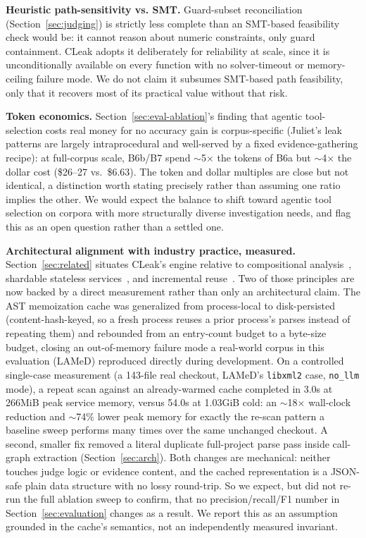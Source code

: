 \documentclass[11pt,a4paper]{article}
\begin{document}
\textbf{Heuristic path-sensitivity vs. SMT.} Guard-subset reconciliation
(Section~\ref{sec:judging}) is strictly less complete than an SMT-based
feasibility check would be: it cannot reason about numeric constraints,
only guard containment. CLeak adopts it deliberately for reliability at
scale, since it is unconditionally available on every function with no
solver-timeout or memory-ceiling failure mode. We do not claim it
subsumes SMT-based path feasibility, only that it recovers most of its
practical value without that risk.

\textbf{Token economics.} Section~\ref{sec:eval-ablation}'s finding that
agentic tool-selection costs real money for no accuracy gain is
corpus-specific (Juliet's leak patterns are largely intraprocedural and
well-served by a fixed evidence-gathering recipe): at full-corpus scale,
B6b/B7 spend $\sim$5$\times$ the tokens of B6a but $\sim$4$\times$ the
dollar cost (\$26--27 vs.\ \$6.63). The token and dollar multiples are
close but not identical, a distinction worth stating precisely rather than
assuming one ratio implies the other. We would expect the balance to
shift toward agentic tool selection on corpora with more structurally
diverse investigation needs, and flag this as an open question rather than
a settled one.

\textbf{Architectural alignment with industry practice, measured.}
Section~\ref{sec:related} situates CLeak's engine relative to compositional
analysis~\cite{infer-verification}, shardable stateless
services~\cite{tricorder}, and incremental reuse~\cite{codeql-incremental,
semgrep}. Two of those principles are now backed by a direct measurement
rather than only an architectural claim. The AST memoization cache was
generalized from process-local to disk-persisted (content-hash-keyed, so a
fresh process reuses a prior process's parses instead of repeating them)
and rebounded from an entry-count budget to a byte-size budget, closing
an out-of-memory failure mode a real-world corpus in this evaluation (LAMeD)
reproduced directly during development. On a controlled single-case
measurement (a 143-file real checkout, LAMeD's \texttt{libxml2} case,
\texttt{no\_llm} mode), a repeat scan against an already-warmed cache
completed in 3.0s at 266MiB peak service memory, versus 54.0s at 1.03GiB
cold: an $\sim$18$\times$ wall-clock reduction and $\sim$74\% lower peak
memory for exactly the re-scan pattern a baseline sweep performs many times
over the same unchanged checkout. A second, smaller fix removed a literal
duplicate full-project parse pass inside call-graph extraction
(Section~\ref{sec:arch}). Both changes are mechanical: neither touches
judge logic or evidence content, and the cached representation is a
JSON-safe plain data structure with no lossy round-trip. So we expect,
but did not re-run the full ablation sweep to confirm, that no
precision/recall/F1 number in Section~\ref{sec:evaluation} changes as a
result. We report this as an assumption grounded in the cache's semantics,
not an independently measured invariant.
\end{document}
